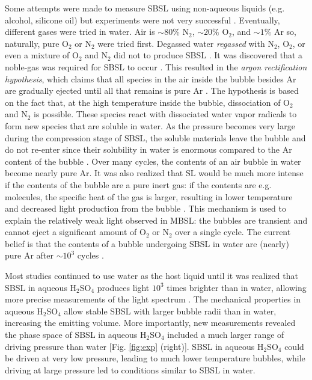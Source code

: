 \documentclass[11pt,prb,aps,nofootinbib,superscriptaddress,floatfix]{revtex4-2}
\begin{document}
Some attempts were made to measure SBSL using non-aqueous liquids (e.g. alcohol, silicone oil) but experiments were not very successful \cite{weninger1995sonoluminescence,barber1997defining,barber1997defining}. Eventually, different gases were tried in water. Air is $\sim 80\%$ N$_2$, $\sim 20\%$ O$_2$, and $\sim 1\% $ Ar so, naturally, pure O$_2$ or N$_2$ were tried first. Degassed water \emph{regassed} with N$_2$, O$_2$, or even a mixture of O$_2$ and N$_2$ did not to produce SBSL \cite{hiller1994effect}. It was discovered that a noble-gas was required for SBSL to occur \cite{barber1997defining,hiller1994effect,brenner2002single}. This resulted in the \emph{argon rectification hypothesis}, which claims that all species in the air inside the bubble besides Ar are gradually ejected until all that remains is pure Ar \cite{lohse1997sonoluminescing,brenner2002single,yasui2018acoustic,suslick2008inside}. The hypothesis is based on the fact that, at the high temperature inside the bubble, dissociation of O$_2$ and N$_2$ is possible. These species react with dissociated water vapor radicals to form new species that are soluble in water. As the pressure becomes very large during the compression stage of SBSL, the soluble materials leave the bubble and do not re-enter since their solubility in water is enormous compared to the Ar content of the bubble \cite{lohse1997sonoluminescing}. Over many cycles, the contents of an air bubble in water become nearly pure Ar. It was also realized that SL would be much more intense if the contents of the bubble are a pure inert gas: if the contents are e.g. molecules, the specific heat of the gas is larger, resulting in lower temperature and decreased light production from the bubble \cite{brenner2002single,yasui2018acoustic,lohse2018bubble,suslick2008inside}. This mechanism is used to explain the relatively weak light observed in MBSL: the bubbles are transient and cannot eject a significant amount of O$_2$ or N$_2$ over a single cycle. The current belief is that the contents of a bubble undergoing SBSL in water are (nearly) pure Ar after $\sim 10^3$ cycles \cite{brenner2002single,yasui2018acoustic}.  

Most studies continued to use water as the host liquid until it was realized that SBSL in aqueous H$_2$SO$_4$ produces light $10^3$ times brighter than in water, allowing more precise measurements of the light spectrum \cite{flannigan2005plasma,flannigan2005plasma1,flannigan2006measurement}. The mechanical properties in aqueous H$_2$SO$_4$ allow stable SBSL with larger bubble radii than in water, increasing the emitting volume. More importantly, new measurements revealed the phase space of SBSL in aqueous H$_2$SO$_4$ included a much larger range of driving pressure than water [Fig. \ref{fig:exp} (right)]. SBSL in aqueous H$_2$SO$_4$ could be driven at very low pressure, leading to much lower temperature bubbles, while driving at large pressure led to conditions similar to SBSL in water. 
\end{document}
